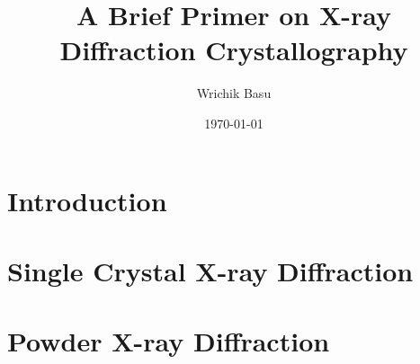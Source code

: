 \documentclass[11pt,a4paper]{article}
\begin{document}
	\title{A Brief Primer on X-ray Diffraction Crystallography}
	\author{Wrichik Basu}
	\date{\today}
	
	\maketitle
	\flushbottom
	
	\section{Introduction}
	
	
		
	
	
	
	
	
	
	
	
	
	
	\section{Single Crystal X-ray Diffraction}
	
		
		
		
	
		
		
		
		
		
		
		
	
	\section{Powder X-ray Diffraction}
	
		
		
	
	
	\medskip
	
	\printbibliography
		
\end{document}
